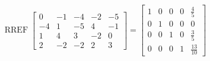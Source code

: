 \begin{exerciseAnswer} 


\[\operatorname{RREF} \left[\begin{array}{ccccc}
0 & -1 & -4 & -2 & -5 \\
-4 & 1 & -5 & 4 & -1 \\
1 & 4 & 3 & -2 & 0 \\
2 & -2 & -2 & 2 & 3
\end{array}\right] = \left[\begin{array}{ccccc}
1 & 0 & 0 & 0 & \frac{4}{5} \\
0 & 1 & 0 & 0 & 0 \\
0 & 0 & 1 & 0 & \frac{3}{5} \\
0 & 0 & 0 & 1 & \frac{13}{10}
\end{array}\right] \]



\end{exerciseAnswer}

